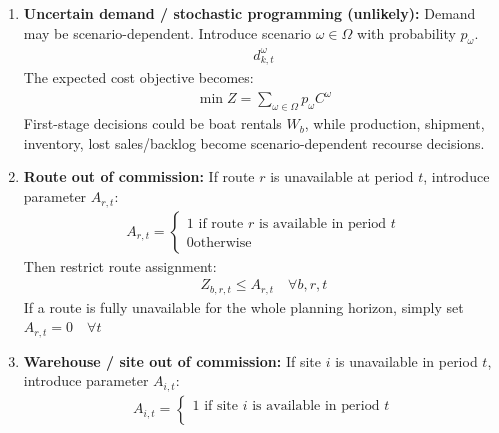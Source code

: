 \documentclass[10pt]{article}
\begin{document}
\begin{enumerate}
    New variable: 
    \begin{gather*}
        E_{k, t} = \text{emergency quantity shipped to district $k $ in period $t $}
    \end{gather*}
    Demand balance: 
    \begin{gather*}
        \sum_i N_{i, k, t} + E_{k, t} = d_{k, t} - L_{k, t}
    \end{gather*}
    Objective func: 
    \begin{gather*}
        + \sum_k\sum_t c^{\text{emergency}} E_{k, t}
    \end{gather*}
    \item \textbf{Uncertain demand / stochastic programming (unlikely):} Demand may be scenario-dependent. Introduce scenario $\omega \in \Omega $ with probability $p_\omega $. 
    \begin{gather*}
        d_{k, t}^\omega 
    \end{gather*}
    The expected cost objective becomes: 
    \begin{gather*}
        \min Z = \sum_{\omega\in\Omega} p_\omega C^\omega 
    \end{gather*}
    First-stage decisions could be boat rentals $W_b $, while production, shipment, inventory, lost sales/backlog become scenario-dependent recourse decisions. 
    \item \textbf{Route out of commission:} If route $r $ is unavailable at period $t $, introduce parameter $A_{r, t} $:
    \begin{gather*}
        A_{r, t} = \begin{cases}
            1\text{ if route $r $ is available in period $t $}\\
            0\text{otherwise}
        \end{cases}
    \end{gather*}
    Then restrict route assignment: 
    \begin{gather*}
        Z_{b, r, t} \le A_{r, t}\quad\forall b, r, t
    \end{gather*}
    If a route is fully unavailable for the whole planning horizon, simply set $A_{r, t} = 0  \quad\forall t$
    \newpage 
    \item \textbf{Warehouse / site out of commission:} If site $i $ is unavailable in period $t $, introduce parameter $A_{i, t} $:
    \begin{gather*}
        A_{i, t} = \begin{cases}
            1\text{ if site $i $ is available in period $t $}\\

\end{cases}
\end{gather*}
\end{enumerate}
\end{document}
